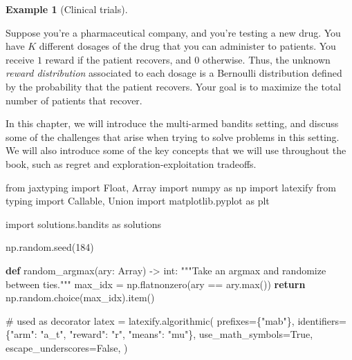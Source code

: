 \documentclass[
  letterpaper,
  DIV=11,
  numbers=noendperiod]{scrreprt}
\newenvironment{Shaded}{\begin{snugshade}}{\end{snugshade}}
\newcommand{\BuiltInTok}[1]{\textcolor[rgb]{0.00,0.23,0.31}{#1}}
\newcommand{\CommentTok}[1]{\textcolor[rgb]{0.37,0.37,0.37}{#1}}
\newcommand{\ControlFlowTok}[1]{\textcolor[rgb]{0.00,0.23,0.31}{\textbf{#1}}}
\newcommand{\DecValTok}[1]{\textcolor[rgb]{0.68,0.00,0.00}{#1}}
\newcommand{\ImportTok}[1]{\textcolor[rgb]{0.00,0.46,0.62}{#1}}
\newcommand{\KeywordTok}[1]{\textcolor[rgb]{0.00,0.23,0.31}{\textbf{#1}}}
\newcommand{\NormalTok}[1]{\textcolor[rgb]{0.00,0.23,0.31}{#1}}
\newcommand{\OperatorTok}[1]{\textcolor[rgb]{0.37,0.37,0.37}{#1}}
\newcommand{\StringTok}[1]{\textcolor[rgb]{0.13,0.47,0.30}{#1}}
\newcommand{\VariableTok}[1]{\textcolor[rgb]{0.07,0.07,0.07}{#1}}
\theoremstyle{plain}
\theoremstyle{plain}
\theoremstyle{definition}
\newtheorem{example}{Example}[chapter]
\theoremstyle{definition}
\theoremstyle{remark}
\begin{document}
\begin{example}[Clinical
trials]\protect\hypertarget{exm-clinical_trials}{}\label{exm-clinical_trials}

Suppose you're a pharmaceutical company, and you're testing a new drug.
You have \(K\) different dosages of the drug that you can administer to
patients. You receive \(1\) reward if the patient recovers, and \(0\)
otherwise. Thus, the unknown \emph{reward distribution} associated to
each dosage is a Bernoulli distribution defined by the probability that
the patient recovers. Your goal is to maximize the total number of
patients that recover.

\end{example}

In this chapter, we will introduce the multi-armed bandits setting, and
discuss some of the challenges that arise when trying to solve problems
in this setting. We will also introduce some of the key concepts that we
will use throughout the book, such as regret and
exploration-exploitation tradeoffs.

\begin{Shaded}
\begin{Highlighting}[]
\ImportTok{from}\NormalTok{ jaxtyping }\ImportTok{import}\NormalTok{ Float, Array}
\ImportTok{import}\NormalTok{ numpy }\ImportTok{as}\NormalTok{ np}
\ImportTok{import}\NormalTok{ latexify}
\ImportTok{from}\NormalTok{ typing }\ImportTok{import}\NormalTok{ Callable, Union}
\ImportTok{import}\NormalTok{ matplotlib.pyplot }\ImportTok{as}\NormalTok{ plt}

\ImportTok{import}\NormalTok{ solutions.bandits }\ImportTok{as}\NormalTok{ solutions}

\NormalTok{np.random.seed(}\DecValTok{184}\NormalTok{)}

\KeywordTok{def}\NormalTok{ random\_argmax(ary: Array) }\OperatorTok{{-}\textgreater{}} \BuiltInTok{int}\NormalTok{:}
    \CommentTok{"""Take an argmax and randomize between ties."""}
\NormalTok{    max\_idx }\OperatorTok{=}\NormalTok{ np.flatnonzero(ary }\OperatorTok{==}\NormalTok{ ary.}\BuiltInTok{max}\NormalTok{())}
    \ControlFlowTok{return}\NormalTok{ np.random.choice(max\_idx).item()}


\CommentTok{\# used as decorator}
\NormalTok{latex }\OperatorTok{=}\NormalTok{ latexify.algorithmic(}
\NormalTok{    prefixes}\OperatorTok{=}\NormalTok{\{}\StringTok{"mab"}\NormalTok{\},}
\NormalTok{    identifiers}\OperatorTok{=}\NormalTok{\{}\StringTok{"arm"}\NormalTok{: }\StringTok{"a\_t"}\NormalTok{, }\StringTok{"reward"}\NormalTok{: }\StringTok{"r"}\NormalTok{, }\StringTok{"means"}\NormalTok{: }\StringTok{"mu"}\NormalTok{\},}
\NormalTok{    use\_math\_symbols}\OperatorTok{=}\VariableTok{True}\NormalTok{,}
\NormalTok{    escape\_underscores}\OperatorTok{=}\VariableTok{False}\NormalTok{,}
\NormalTok{)}
\end{Highlighting}
\end{Shaded}
\end{document}

